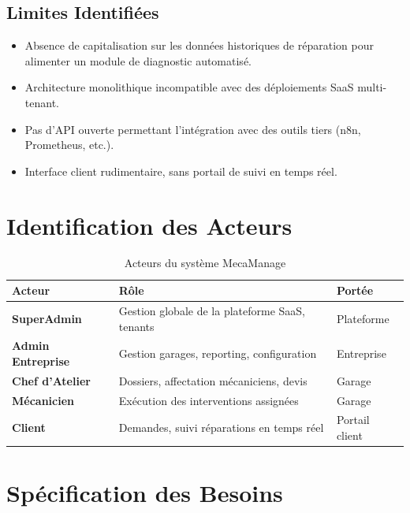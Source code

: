 \documentclass[12pt,a4paper]{report}
\begin{document}
\subsection{Limites Identifi\'{e}es}

\begin{itemize}
  \item Absence de capitalisation sur les donn\'{e}es historiques de
    r\'{e}paration pour alimenter un module de diagnostic automatis\'{e}.
  \item Architecture monolithique incompatible avec des d\'{e}ploiements
    SaaS multi-tenant.
  \item Pas d'API ouverte permettant l'int\'{e}gration avec des outils
    tiers (n8n, Prometheus, etc.).
  \item Interface client rudimentaire, sans portail de suivi en temps r\'{e}el.
\end{itemize}

\section{Identification des Acteurs}

\begin{table}[H]
\centering
\caption{Acteurs du syst\`{e}me MecaManage}
\label{tab:acteurs}
\renewcommand{\arraystretch}{1.4}
\begin{tabularx}{\textwidth}{|l|X|l|}
\hline
\rowcolor{primary!20}
\textbf{Acteur} & \textbf{R\^{o}le} & \textbf{Port\'{e}e} \\
\hline
\textbf{SuperAdmin} & Gestion globale de la plateforme SaaS, tenants
  & Plateforme \\
\hline
\textbf{Admin Entreprise} & Gestion garages, reporting, configuration
  & Entreprise \\
\hline
\textbf{Chef d'Atelier} & Dossiers, affectation m\'{e}caniciens, devis
  & Garage \\
\hline
\textbf{M\'{e}canicien} & Ex\'{e}cution des interventions assign\'{e}es
  & Garage \\
\hline
\textbf{Client} & Demandes, suivi r\'{e}parations en temps r\'{e}el
  & Portail client \\
\hline
\end{tabularx}
\end{table}

\section{Sp\'{e}cification des Besoins}
\end{document}
